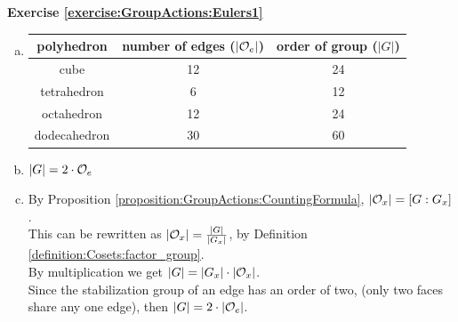 \noindent\textbf{Exercise \ref{exercise:GroupActions:Eulers1}}
\begin{enumerate}[(a)]
\item
%
\begin{tabular}{|c | c | c|}\hline
polyhedron & number of edges ($|{\cal O}_e|$) & order of group ($|G|$)\\ \hline
cube &  12 &   24\\ \hline
tetrahedron &  6&   12\\ \hline
octahedron & 12 &24\\ \hline
dodecahedron &  30&60\\ \hline 
\end{tabular}

\item
$|G| = 2 \cdot {\cal O}_e$

\item 
By Proposition \ref{proposition:GroupActions:CountingFormula}, $|{\cal O}_x| = [G : G_x]$.  
\\
This can be rewritten as $|{\cal O}_x| = \frac{|G|}{|{G_x|}}$, by Definition \ref{definition:Cosets:factor_group}.
\\
By multiplication we get $|G| = |G_x| \cdot |{\cal O}_x|$. 
\\
Since the stabilization group of an edge has an order of two, (only two faces share any one edge), then $|G| = 2 \cdot |{\cal O}_e|$.
\end{enumerate}

